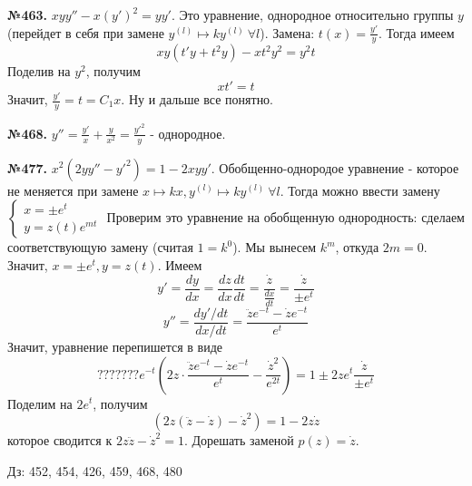 \textbf{№463.} $xyy''-x(y')^2=yy'$. Это уравнение, однородное относительно
группы $y$ (перейдет в себя при замене $y^{(l)}\mapsto ky^{(l)}~\forall  l$).
Замена: $t(x)=\frac{y'}{y}$. Тогда имеем
$$xy(t'y+t^2y)-xt^2y^2=y^2t$$ 
Поделив на $y^2$, получим
$$xt'=t$$
Значит, $\frac{y'}{y}=t=C_1x$. Ну и дальше все понятно. 


\textbf{№468.} $y''=\frac{y'}{x}+\frac{y}{x^2}=\frac{y'^2}{y}$ - 
однородное. 

\textbf{№477.} $x^2(2yy''-y'^2)=1-2xyy'$.
Обобщенно-однородое уравнение - которое не меняется при замене
$x\mapsto kx,y^{(l)}\mapsto ky^{(l)}~\forall  l$. Тогда можно ввести замену
$\begin{cases}
    x=\pm e^t\\y=z(t)e^{mt}
\end{cases}$
Проверим это уравнение на обобщенную однородность: сделаем соответствующую
замену (считая $1=k^0$). Мы вынесем $k^m$, откуда  $2m=0$. Значит,
$x=\pm e^t,y=z(t)$. Имеем 
$$y'=\frac{dy}{dx}=\frac{dz}{dx}\frac{dt}{dt}=\frac{\dot z}{\frac{dx}{dt}}=
\frac{\dot z}{\pm e^t}$$
$$y''=\frac{dy' / dt}{dx / dt}=\frac{\ddot ze^{-t}-\dot ze^{-t}}{e^t}$$ 
Значит, уравнение перепишется в виде
$$???????e^{-t}\left( 2 z\cdot
\frac{\ddot ze^{-t}-\dot ze^{-t}}{e^t} - \frac{\dot z^2}{e^{2t}} \right) =
1\pm 2ze^t \frac{\dot z}{\pm e^t}
$$
Поделим на $2e^t$, получим
$$(2z(\ddot z-\dot z)-\dot z^2)=1-2z\dot z$$
которое сводится к $2z\ddot z - \dot z^2 =1$. Дорешать заменой  $p(z)=\dot z$.

Дз: 452, 454, 426, 459, 468, 480 

